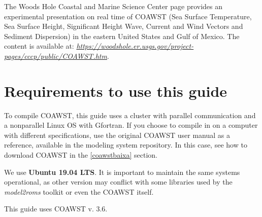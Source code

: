 \noindent The Woods Hole Coastal and Marine Science Center page provides an experimental presentation on real time of COAWST (Sea Surface Temperature, Sea Surface Height, Significant Height
Wave, Current and Wind Vectors and Sediment Dispersion) in the eastern United States and Gulf of Mexico. The content is available at: 
\textcolor{bleu_cite}{\href{https://woodshole.er.usgs.gov/project-pages/cccp/public/COAWST.htm}{\textit{https://woodshole.er.usgs.gov/project-pages/cccp/public/COAWST.htm}}}.
\bigskip

\section{Requirements to use this guide}
\bigskip

\noindent To compile COAWST, this guide uses a cluster with parallel communication and a nonparallel Linux OS with Gfortran. If you choose to compile in
on a computer with different specifications, use the original COAWST user manual as a reference, available in the modeling system repository. In this case,
see how to download COAWST in the \textcolor{bleu_cite}{\ref{coawstbaixa}} section.
\bigskip

\noindent We use \textbf{Ubuntu 19.04 LTS}. It is important to maintain the same systems operational, as other version may conflict with some libraries used by the \textit{model2roms} toolkit or 
even the COAWST itself.
\bigskip

\begin{tcolorbox}[enhanced,
    grow to left by=0cm,%
    grow to right by=0cm,%
    enlarge top by=0cm,%
    enlarge bottom by=0cm,%
    tcbox raise base,
    boxrule=1.0pt,
    left=18mm,
    colframe=red!50!black,coltext=red!25!black,colback=red!10!white,
    overlay={\begin{tcbclipinterior}\fill[red!75!blue!50!white] (frame.south west)
      rectangle node[text=white,font=\sffamily\bfseries\footnotesize,rotate=0] {WARNING} ([xshift=18mm]frame.north west);\end{tcbclipinterior}}]
      This guide uses COAWST v. 3.6.
  \end{tcolorbox}
  \bigskip
